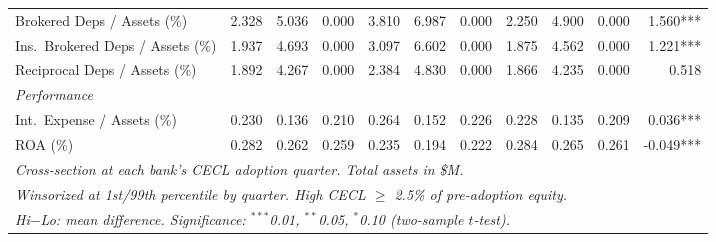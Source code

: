 \begin{tabular}{lrrr rrr rrr r}
  \hspace{1em}Brokered Deps / Assets (\%) & 2.328 & 5.036 & 0.000 & 3.810 & 6.987 & 0.000 & 2.250 & 4.900 & 0.000 & 1.560*** \\
  \hspace{1em}Ins.\ Brokered Deps / Assets (\%) & 1.937 & 4.693 & 0.000 & 3.097 & 6.602 & 0.000 & 1.875 & 4.562 & 0.000 & 1.221*** \\
  \hspace{1em}Reciprocal Deps / Assets (\%) & 1.892 & 4.267 & 0.000 & 2.384 & 4.830 & 0.000 & 1.866 & 4.235 & 0.000 & 0.518 \\
  \midrule
  \emph{Performance} & & & & & & & & & & \\
  \hspace{1em}Int.\ Expense / Assets (\%) & 0.230 & 0.136 & 0.210 & 0.264 & 0.152 & 0.226 & 0.228 & 0.135 & 0.209 & 0.036*** \\
  \hspace{1em}ROA (\%) & 0.282 & 0.262 & 0.259 & 0.235 & 0.194 & 0.222 & 0.284 & 0.265 & 0.261 & -0.049*** \\
  \midrule
  \midrule
  \multicolumn{11}{l}{\emph{Cross-section at each bank's CECL adoption quarter. Total assets in \$M.}} \\
  \multicolumn{11}{l}{\emph{Winsorized at 1st/99th percentile by quarter. High CECL $\geq$ 2.5\% of pre-adoption equity.}} \\
  \multicolumn{11}{l}{\emph{Hi$-$Lo: mean difference. Significance: $^{***}$0.01, $^{**}$0.05, $^{*}$0.10 (two-sample $t$-test).}} \\
\end{tabular}
\par\endgroup
